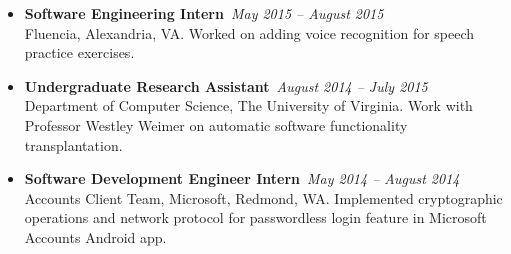 \documentclass[10pt]{article}
\newenvironment{job}[3]{\setlength{\parskip}{0pt}%
	\begin{itemize}[label={},leftmargin=0cm,labelindent=0pt,nolistsep]%
		\item\textbf{#1}~\hfill\emph{#2}\\{#3}.}{\end{itemize}\medskip}
\begin{document}
\begin{job}{Software Engineering Intern}{May 2015 -- August 2015}{Fluencia, Alexandria,
		VA}
	Worked on adding voice recognition for speech practice exercises.
\end{job}

\begin{job}{Undergraduate Research Assistant}{August 2014 -- July 2015}{Department of Computer
		Science, The University of Virginia}
	Work with Professor Westley Weimer on automatic software functionality transplantation.
\end{job}

\begin{job}{Software Development Engineer Intern}{May 2014 -- August 2014}{Accounts Client Team,
		Microsoft, Redmond, WA}
	Implemented cryptographic operations and network protocol for passwordless login feature in
	Microsoft Accounts Android app.
\end{job}
\end{document}
